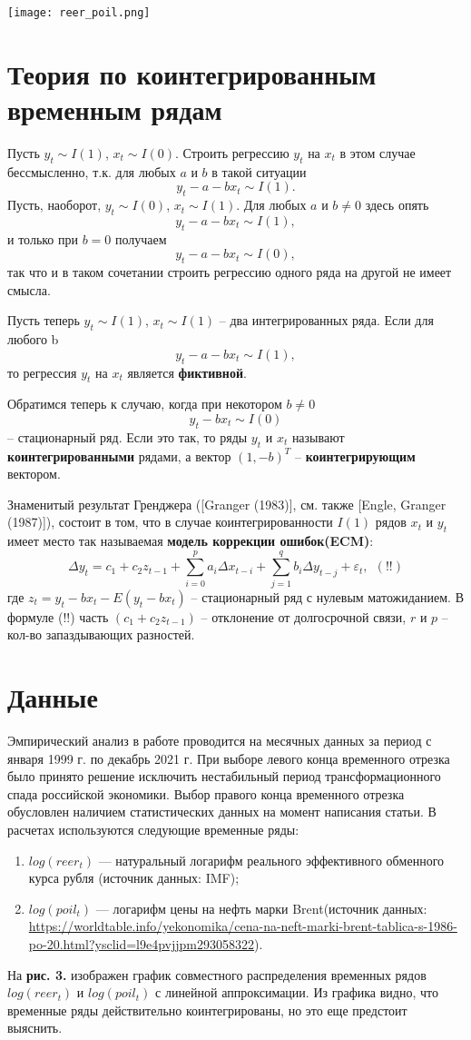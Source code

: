 \documentclass{article}
\begin{document}
\begin{center}
\texttt{[image: reer\_poil.png]}
\end{center}
\section{Теория по коинтегрированным временным рядам}
Пусть $y_t\sim I(1)$,  $x_t\sim I(0)$. Строить регрессию $y_t$ на $x_t$ в этом случае бессмысленно, т.к. для любых $a$ и $b$ в такой ситуации
$$y_t-a-bx_t\sim I(1).$$
Пусть, наоборот, $y_t \sim I(0)$, $x_t \sim I(1)$. Для любых $a$ и $b \neq 0$ здесь опять 
$$y_t-a-bx_t\sim I(1),$$
и только при $b = 0$ получаем
$$y_t-a-bx_t \sim I(0),$$
так что и в таком сочетании строить регрессию одного ряда на другой не имеет смысла.

Пусть теперь $y_t \sim I(1)$, $x_t \sim I(1)$ – два интегрированных ряда.
Если для любого b
$$y_t-a-bx_t\sim I(1),$$
то регрессия $y_t$ на $x_t$ является \textbf{фиктивной}.

Обратимся теперь к случаю, когда при некотором $b \neq 0$
$$y_t - b x_t \sim I(0)$$ 
-- стационарный ряд. Если это так, то ряды $y_t$ и $x_t$ называют \textbf{коинтегрированными} рядами, а вектор $(1, -b)^T$ -- \textbf{коинтегрирующим} вектором.

Знаменитый результат Гренджера ([Granger (1983)], см. также [Engle, Granger (1987)]), состоит в том, что в случае коинтегрированности $I(1)$ рядов $x_t$ и $y_t$ имеет место так называемая \textbf{модель коррекции ошибок(ECM)}:
$$\Delta y_t=c_1+c_2z_{t-1}+\sum_{i=0}^p{a_i \Delta x_{t-i}}+\sum_{j=1}^q{b_i \Delta y_{t-j}}+\varepsilon_t,~~(!!)$$
где $z_t=y_t-bx_t-E(y_t-bx_t)$ -- стационарный ряд с нулевым матожиданием. В формуле (!!) часть $(c_1+c_2z_{t-1})$ -- отклонение от долгосрочной связи, $r$ и $p$ -- кол-во запаздывающих разностей.

\section{Данные}
Эмпирический анализ в работе проводится на месячных данных за период с января 1999 г. по декабрь 2021 г. При выборе левого конца временного отрезка было принято решение исключить нестабильный период трансформационного спада российской экономики. Выбор правого конца временного отрезка обусловлен наличием статистических данных на момент написания статьи. В расчетах используются следующие временные ряды:
\begin{enumerate}
\item $log(reer_t)$ — натуральный логарифм реального эффективного обменного курса рубля (источник данных: IMF);
\item $log(poil_t)$ — логарифм цены на нефть марки Brent(источник данных: \url{https://worldtable.info/yekonomika/cena-na-neft-marki-brent-tablica-s-1986-po-20.html?ysclid=l9e4pvjjpm293058322}).
\end{enumerate}
На \textbf{рис. 3.} изображен график совместного распределения временных рядов $log(reer_t)$ и  $log(poil_t)$ с линейной аппроксимации. Из графика видно, что временные ряды действительно коинтегрированы, но это еще предстоит выяснить. 
\end{document}
